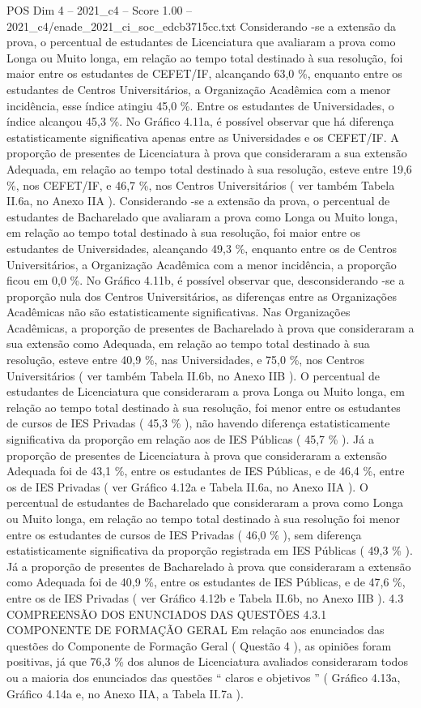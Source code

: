 \begin{textsample}{POS Dim 4 – 2021\_c4 – Score 1.00 – 2021\_c4/enade\_2021\_ci\_soc\_edcb3715cc.txt}
Considerando -se a extensão da prova, o percentual de estudantes de Licenciatura que avaliaram a prova como Longa ou Muito longa, em relação ao tempo total destinado à sua resolução, foi maior entre os estudantes de CEFET/IF, alcançando 63,0 \%, enquanto entre os estudantes de Centros Universitários, a Organização Acadêmica com a menor incidência, esse índice atingiu 45,0 \%.
Entre os estudantes de Universidades, o índice alcançou 45,3 \%.
No Gráfico 4.11a, é possível observar que há diferença estatisticamente significativa apenas entre as Universidades e os CEFET/IF.
A proporção de presentes de Licenciatura à prova que consideraram a sua extensão Adequada, em relação ao tempo total destinado à sua resolução, esteve entre 19,6 \%, nos CEFET/IF, e 46,7 \%, nos Centros Universitários ( ver também Tabela II.6a, no Anexo IIA ).
Considerando -se a extensão da prova, o percentual de estudantes de Bacharelado que avaliaram a prova como Longa ou Muito longa, em relação ao tempo total destinado à sua resolução, foi maior entre os estudantes de Universidades, alcançando 49,3 \%, enquanto entre os de Centros Universitários, a Organização Acadêmica com a menor incidência, a proporção ficou em 0,0 \%.
No Gráfico 4.11b, é possível observar que, desconsiderando -se a proporção nula dos Centros Universitários, as diferenças entre as Organizações Acadêmicas não são estatisticamente significativas.
Nas Organizações Acadêmicas, a proporção de presentes de Bacharelado à prova que consideraram a sua extensão como Adequada, em relação ao tempo total destinado à sua resolução, esteve entre 40,9 \%, nas Universidades, e 75,0 \%, nos Centros Universitários ( ver também Tabela II.6b, no Anexo IIB ).
O percentual de estudantes de Licenciatura que consideraram a prova Longa ou Muito longa, em relação ao tempo total destinado à sua resolução, foi menor entre os estudantes de cursos de IES Privadas ( 45,3 \% ), não havendo diferença estatisticamente significativa da proporção em relação aos de IES Públicas ( 45,7 \% ).
Já a proporção de presentes de Licenciatura à prova que consideraram a extensão Adequada foi de 43,1 \%, entre os estudantes de IES Públicas, e de 46,4 \%, entre os de IES Privadas ( ver Gráfico 4.12a e Tabela II.6a, no Anexo IIA ).
O percentual de estudantes de Bacharelado que consideraram a prova como Longa ou Muito longa, em relação ao tempo total destinado à sua resolução foi menor entre os estudantes de cursos de IES Privadas ( 46,0 \% ), sem diferença estatisticamente significativa da proporção registrada em IES Públicas ( 49,3 \% ).
Já a proporção de presentes de Bacharelado à prova que consideraram a extensão como Adequada foi de 40,9 \%, entre os estudantes de IES Públicas, e de 47,6 \%, entre os de IES Privadas ( ver Gráfico 4.12b e Tabela II.6b, no Anexo IIB ). 4.3 COMPREENSÃO DOS ENUNCIADOS DAS QUESTÕES 4.3.1 COMPONENTE DE FORMAÇÃO GERAL Em relação aos enunciados das questões do Componente de Formação Geral ( Questão 4 ), as opiniões foram positivas, já que 76,3 \% dos alunos de Licenciatura avaliados consideraram todos ou a maioria dos enunciados das questões “ claros e objetivos ” ( Gráfico 4.13a, Gráfico 4.14a e, no Anexo IIA, a Tabela II.7a ).

\end{textsample}
